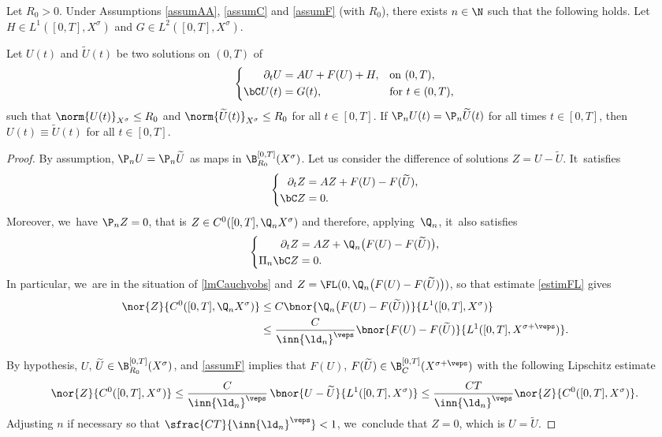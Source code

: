\begin{proposition}\label{prop:finite-det-modes}
Let $R_{0}>0$. Under Assumptions \ref{assumAA}, \ref{assumC} and \ref{assumF} (with $R_{0}$), there exists $n\in \N$ such that the following holds. Let $H\in L^1([0,T],X^{\sigma})$ and $G\in L^2([0, T], X^\sigma)$.

Let $U(t)$ and $\widetilde{U}(t)$ be two solutions on $(0,T)$ of
\begin{align*}
\left\{\begin{aligned}
\partial_t U&=AU+F(U)+H, &&\text{on } (0, T), \\
\bC U(t)&=G(t), && \text{for } t\in (0, T),
\end{aligned}\right.
\end{align*}
such that $\norm{U(t)}_{X^\sigma}\leq R_{0}$ and $\norm{\widetilde{U}(t)}_{X^\sigma}\leq R_{0}$ for all $t\in [0, T]$. If $\P_n U(t)=\P_n \widetilde{U}(t)$ for all times $t\in [0, T]$, then $U(t)\equiv \widetilde{U}(t)$ for all $t\in [0, T]$.
\end{proposition}
\begin{proof}
By assumption, $\P_{n}U=\P_{n}\widetilde{U}$ as maps in $\B_{R_{0}}^{[0,T]}(X^{\sigma})$. Let us consider the difference of solutions $Z=U-\widetilde{U}$. It~satisfies
\begin{align*}
\left\{\begin{aligned}
\partial_t Z&=AZ+F(U)-F(\widetilde{U}), \\
\bC Z&=0.
\end{aligned}\right.
\end{align*}
Moreover, we~have $\P_n Z=0$, that is $Z\in C^{0}([0,T],\Q_{n}X^{\sigma})$ and therefore, applying~$\Q_n$, it~also satisfies
\begin{align*}
\left\{\begin{aligned}
\partial_t Z&=AZ+\Q_n \bigl(F(U)-F(\widetilde{U})\bigr), \\
\Pi_{n}\bC Z&=0.
\end{aligned}\right.
\end{align*}
In particular, we~are in the situation of \cref{lmCauchyobs} and $Z=\FL(0,\Q_n \big(F(U)-F(\widetilde{U})\big))$, so that estimate \eqref{estimFL} gives
\begin{align*}
\nor{Z}{C^{0}([0,T],\Q_{n}X^{\sigma})}&\leq C \bnor{\Q_n \bigl(F(U)-F(\widetilde{U})\bigr)}{L^{1}([0,T],X^{\sigma})}\\
&\leq \dfrac{C}{\inn{\ld_n}^\veps} \bnor{F(U)-F(\widetilde{U})}{L^{1}([0,T],X^{\sigma+\veps})}.
\end{align*}

By hypothesis, $U$, $\widetilde{U}\in \B_{R_0}^{[0, T]}(X^\sigma)$, and \cref{assumF} implies that $F(U)$, $F(\widetilde{U})\in \B_{C}^{[0,T]}(X^{\sigma+\veps})$ with the following Lipschitz estimate
\begin{align*}
\nor{Z}{C^{0}([0,T],X^{\sigma})}\leq \dfrac{C}{\inn{\ld_n}^\veps}\, \bnor{U-\widetilde{U}}{L^{1}([0,T],X^{\sigma})}\leq \dfrac{CT}{\inn{\ld_n}^\veps} \nor{Z}{C^{0}([0,T],X^{\sigma})}.
\end{align*}
Adjusting $n$ if necessary so that $\sfrac{CT}{\inn{\ld_n}^\veps}<1$, we~conclude that $Z=0$, which is $U= \widetilde{U}$.
\end{proof}

